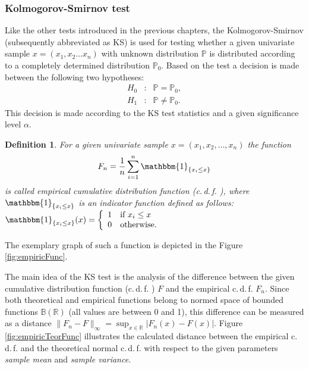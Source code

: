 \documentclass[a4paper, 12pt, titlepage, headsepline, listof = totoc, bibliography = totoc, numbers = noenddot]{scrartcl}
\newcommand{\cdf}{c.\,d.\,f. }
\newtheorem{df}{Definition}
\begin{document}
\subsubsection{Kolmogorov-Smirnov test}\label{sec:kolm-smir}
Like the other tests introduced in the previous chapters, the Kolmogorov-Smirnov (subsequently abbreviated as KS) is used for testing whether a given univariate sample $x=(x_1,x_2 \dots x_n)$ with unknown distribution $\mathbb{P}$ is distributed according to a completely determined distribution $\mathbb{P}_0$. Based on the test a decision is made between the following two hypotheses:
\[\begin{array}{rcl}
H_0 & : & \mathbb{P} = \mathbb{P}_0,\\
H_1 & : & \mathbb{P} \ne \mathbb{P}_0.
\end{array}\]
This decision is made according to the KS test
statistics and a given significance level $\alpha$.

\begin{df}
For a given univariate sample $x=(x_1, x_2, \dots, x_n)$ the function
\[F_n=\frac{1}{n}\sum_{i=1}^n \mathbbm{1}_{\{x_i\le x\}}\] is called empirical
cumulative distribution function (\cdf), where $\mathbbm{1}_{\{x_i\le x\}}$ is an
indicator function defined as follows: $\mathbbm{1}_{\{x_i\le x\}}(x)=\left\lbrace 
\begin{array}{cll}
                 1 & \mbox{if} \ x_i\le x\\
                 0 & \mbox{otherwise}.
\end{array} 
\right.$
\end{df}
The exemplary graph of such a function is depicted in the Figure
\ref{fig:empiricFunc}. 

The main idea of the KS test is the analysis of the difference between the given
cumulative distribution function (\cdf) $F$ and the empirical \cdf $F_n$. Since
both theoretical and empirical functions belong to normed space of bounded
functions $\mathbb{B}(\mathbb{R})$ (all values are between 0 and 1), this difference can be measured as
a distance $\|F_n-F\|_{\infty}=\sup_{x \in \mathbb{R}}|F_n(x)-F(x)|$. Figure
\ref{fig:empiricTeorFunc} illustrates the calculated distance between the
empirical \cdf and the theoretical normal \cdf with respect to the given parameters \textit{sample mean}
and \textit{sample variance}. 
\end{document}
